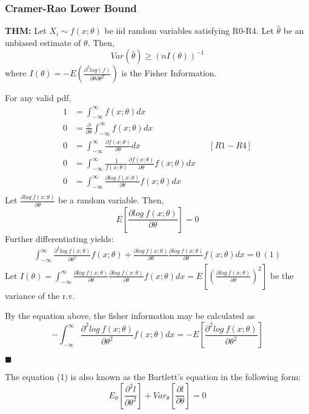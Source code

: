 \documentclass[9pt]{article}
\newcommand{\thm}{\textbf{THM: }}
\renewcommand{\qed}{\hfill$\blacksquare$}
\renewenvironment{proof}{\begin{addmargin}[1em]{0em}\begin{newproof}}{\end{newproof}\end{addmargin}\qed}
\begin{document}
\subsubsection{Cramer-Rao Lower Bound}
\thm Let $X_i\sim f(x;\theta)$ be iid random variables satisfying R0-R4. Let $\hat \theta$ be an unbiased estimate of $\theta$. Then,
$$
    Var(\hat \theta) \ge (nI(\theta))^{-1}
$$
where $I(\theta)=-E(\frac{\partial^2 log(f)}{\partial \theta \partial \theta^T})$ is the Fisher Information.
\begin{proof}
    For any valid pdf,
        \begin{align*}
        1 &= \int^\infty_{-\infty} f(x;\theta)dx\\
        0 &= \frac{\partial}{\partial \theta} \int^\infty_{-\infty} f(x;\theta)dx\\
        0 &= \int^\infty_{-\infty} \frac{\partial f(x;\theta)}{\partial \theta}dx &&[R1-R4]\\
        0 &= \int^\infty_{-\infty} \frac{1}{f(x;\theta)} \frac{\partial f(x;\theta)}{\partial \theta} f(x;\theta)dx\\
        0 &= \int^\infty_{-\infty} \frac{\partial log\ f(x;\theta)}{\partial \theta}f(x;\theta)dx\\
    \end{align*}
    Let $\frac{\partial log\ f(x;\theta)}{\partial \theta}$ be a random variable. Then,
        $$
        E\left[\frac{\partial log\ f(x;\theta)}{\partial \theta}\right] = 0 
    $$
    Further differentiating yields:
        \begin{align*}
        \int^\infty_{-\infty} \frac{\partial^2 log\ f(x;\theta)}{\partial \theta^2}f(x;\theta) + \frac{\partial log\ f(x;\theta)}{\partial \theta}\frac{\partial log\ f(x;\theta)}{\partial \theta}f(x;\theta)dx = 0 \: (1)
    \end{align*}
    Let $I(\theta) = \int^\infty_{-\infty}\frac{\partial log\ f(x;\theta)}{\partial \theta}\frac{\partial log\ f(x;\theta)}{\partial \theta}f(x;\theta)dx = E\left[(\frac{\partial log\ f(x;\theta)}{\partial \theta})^2\right]$ be the variance of the r.v.
    
    By the equation above, the fisher information may be calculated as
    $$
       - \int^\infty_{-\infty} \frac{\partial^2 log\ f(x;\theta)}{\partial \theta^2}f(x;\theta)dx = -E\left[ \frac{\partial^2 log\ f(x;\theta)}{\partial \theta^2} \right]
    $$
\end{proof}     

The equation (1) is also known as the Bartlett's equation in the following form:
$$
E_\theta\left[ \frac{\partial^2 l}{\partial \theta^2} \right] + Var_\theta\left[ \frac{\partial l}{\partial \theta} \right] = 0
$$
\end{document}
